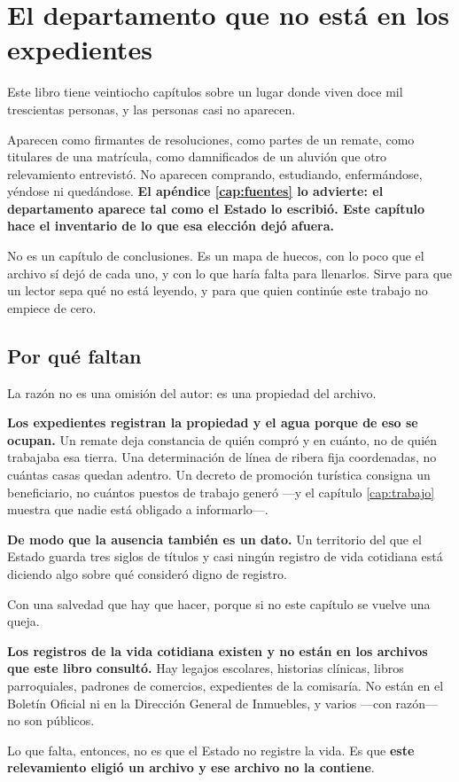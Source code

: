 \chapter{El departamento que no está en los expedientes}
\label{cap:ausencias}

Este libro tiene veintiocho capítulos sobre un lugar donde viven doce mil trescientas personas,
y las personas casi no aparecen.

Aparecen como firmantes de resoluciones, como partes de un remate, como titulares de una
matrícula, como damnificados de un aluvión que otro relevamiento entrevistó. No aparecen
comprando, estudiando, enfermándose, yéndose ni quedándose. \textbf{El apéndice \ref{cap:fuentes} lo advierte: el departamento aparece tal como el Estado lo escribió. Este capítulo hace el
inventario de lo que esa elección dejó afuera.}

No es un capítulo de conclusiones. Es un mapa de huecos, con lo poco que el archivo sí dejó de
cada uno, y con lo que haría falta para llenarlos. Sirve para que un lector sepa qué no está
leyendo, y para que quien continúe este trabajo no empiece de cero.

\section{Por qué faltan}

La razón no es una omisión del autor: es una propiedad del archivo.

\textbf{Los expedientes registran la propiedad y el agua porque de eso se ocupan.} Un remate
deja constancia de quién compró y en cuánto, no de quién trabajaba esa tierra. Una determinación
de línea de ribera fija coordenadas, no cuántas casas quedan adentro. Un decreto de promoción
turística consigna un beneficiario, no cuántos puestos de trabajo generó ---y el capítulo
\ref{cap:trabajo} muestra que nadie está obligado a informarlo---.

\textbf{De modo que la ausencia también es un dato.} Un territorio del que el Estado guarda
tres siglos de títulos y casi ningún registro de vida cotidiana está diciendo algo sobre qué
consideró digno de registro.

\begin{cautela}
Con una salvedad que hay que hacer, porque si no este capítulo se vuelve una queja.

\textbf{Los registros de la vida cotidiana existen y no están en los archivos que este libro
consultó.} Hay legajos escolares, historias clínicas, libros parroquiales, padrones de
comercios, expedientes de la comisaría. No están en el Boletín Oficial ni en la Dirección
General de Inmuebles, y varios ---con razón--- no son públicos.

Lo que falta, entonces, no es que el Estado no registre la vida. Es que \textbf{este
relevamiento eligió un archivo y ese archivo no la contiene}.
\end{cautela}

